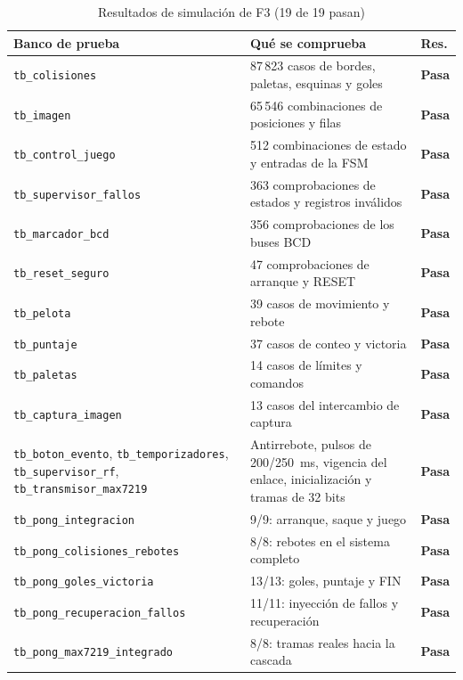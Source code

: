 \documentclass[conference,a4paper]{IEEEtran}
\newcommand{\ok}{\textcolor{green!45!black}{\textbf{Pasa}}}
\begin{document}
\begin{table}[!t]
\centering
\caption{Resultados de simulación de F3 (19 de 19 pasan)}
\label{tab:sim}
\footnotesize
\begin{tabularx}{\textwidth}{@{}>{\raggedright\arraybackslash}p{} Y l@{}}
\toprule
\textbf{Banco de prueba} & \textbf{Qué se comprueba} & \textbf{Res.} \\
\midrule
\texttt{tb\_colisiones} & 87\,823 casos de bordes, paletas, esquinas y goles & \ok \\
\texttt{tb\_imagen} & 65\,546 combinaciones de posiciones y filas & \ok \\
\texttt{tb\_control\_juego} & 512 combinaciones de estado y entradas de la FSM & \ok \\
\texttt{tb\_supervisor\_fallos} & 363 comprobaciones de estados y registros inválidos & \ok \\
\texttt{tb\_marcador\_bcd} & 356 comprobaciones de los buses BCD & \ok \\
\texttt{tb\_reset\_seguro} & 47 comprobaciones de arranque y RESET & \ok \\
\texttt{tb\_pelota} & 39 casos de movimiento y rebote & \ok \\
\texttt{tb\_puntaje} & 37 casos de conteo y victoria & \ok \\
\texttt{tb\_paletas} & 14 casos de límites y comandos & \ok \\
\texttt{tb\_captura\_imagen} & 13 casos del intercambio de captura & \ok \\
\texttt{tb\_boton\_evento}, \texttt{tb\_temporizadores}, \texttt{tb\_supervisor\_rf}, \texttt{tb\_transmisor\_max7219} & Antirrebote, pulsos de 200/250~ms, vigencia del enlace, inicialización y tramas de 32 bits & \ok \\
\midrule
\texttt{tb\_pong\_integracion} & 9/9: arranque, saque y juego & \ok \\
\texttt{tb\_pong\_colisiones\_rebotes} & 8/8: rebotes en el sistema completo & \ok \\
\texttt{tb\_pong\_goles\_victoria} & 13/13: goles, puntaje y FIN & \ok \\
\texttt{tb\_pong\_recuperacion\_fallos} & 11/11: inyección de fallos y recuperación & \ok \\
\texttt{tb\_pong\_max7219\_integrado} & 8/8: tramas reales hacia la cascada & \ok \\
\bottomrule
\end{tabularx}
\end{table}
\end{document}
